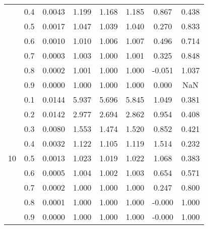 \documentclass[11pt,a4paper]{report}
\begin{document}
\begin{longtable}{ | c | c || c | c | c | c | c | c | }
 & 0.4 & 0.0043 & 1.199 & 1.168 & 1.185 & 0.867 & 0.438 \\
 & 0.5 & 0.0017 & 1.047 & 1.039 & 1.040 & 0.270 & 0.833 \\
 & 0.6 & 0.0010 & 1.010 & 1.006 & 1.007 & 0.496 & 0.714 \\
 & 0.7 & 0.0003 & 1.003 & 1.000 & 1.001 & 0.325 & 0.848 \\
 & 0.8 & 0.0002 & 1.001 & 1.000 & 1.000 & -0.051 & 1.037 \\
 & 0.9 & 0.0000 & 1.000 & 1.000 & 1.000 & 0.000 & NaN \\
 \hline
\multirow{9}{*}{10} & 0.1 & 0.0144 & 5.937 & 5.696 & 5.845 & 1.049 & 0.381 \\
 & 0.2 & 0.0142 & 2.977 & 2.694 & 2.862 & 0.954 & 0.408 \\
 & 0.3 & 0.0080 & 1.553 & 1.474 & 1.520 & 0.852 & 0.421 \\
 & 0.4 & 0.0032 & 1.122 & 1.105 & 1.119 & 1.514 & 0.232 \\
 & 0.5 & 0.0013 & 1.023 & 1.019 & 1.022 & 1.068 & 0.383 \\
 & 0.6 & 0.0005 & 1.004 & 1.002 & 1.003 & 0.654 & 0.571 \\
 & 0.7 & 0.0002 & 1.000 & 1.000 & 1.000 & 0.247 & 0.800 \\
 & 0.8 & 0.0001 & 1.000 & 1.000 & 1.000 & -0.000 & 1.000 \\
 & 0.9 & 0.0000 & 1.000 & 1.000 & 1.000 & -0.000 & 1.000 \\
 \hline
\hline
\end{longtable}
\end{document}
